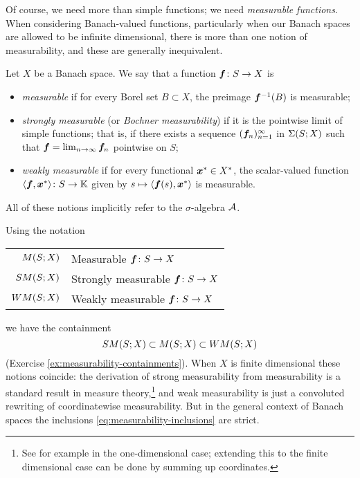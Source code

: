 Of course, we need more than simple functions; we need \emph{measurable functions}.
When considering Banach-valued functions, particularly when our Banach spaces are allowed to be infinite dimensional, there is more than one notion of measurability, and these are generally inequivalent.

\begin{defn}
  Let $X$ be a Banach space.
  We say that a function $\bm{f} \colon S \rightarrow X$ is
  \begin{itemize}
  \item
    \emph{measurable} if for every Borel set $B \subset X$, the preimage $\bm{f}^{-1}(B)$ is measurable;
  \item
    \emph{strongly measurable} (or \emph{Bochner measurability}) if it is the pointwise limit of simple functions; that is, if there exists a sequence $(\bm{f}_n)_{n=1}^\infty$ in $\Sigma(S;X)$ such that $\bm{f} = \lim_{n \to \infty} \bm{f}_n$ pointwise on $S$;
  \item
    \emph{weakly measurable} if for every functional $\bm{x}^* \in X^*$, the scalar-valued function $\langle \bm{f}, \bm{x}^*\rangle \colon S \rightarrow \mathbb{K}$ given by $s \mapsto \langle \bm{f}(s), \bm{x}^* \rangle$ is measurable.
  \end{itemize}
  All of these notions implicitly refer to the $\sigma$-algebra $\mathcal{A}$.
\end{defn}

Using the notation
\begin{center}
  \begin{tabular}{r|l}
    $M (S;X)$  & Measurable $\bm{f} \colon S \rightarrow X$    \\
    $SM(S;X)$  & Strongly measurable $\bm{f} \colon S \rightarrow X$ \\
    $WM(S;X)$  & Weakly measurable $\bm{f} \colon S \rightarrow X$
  \end{tabular}
\end{center}
we have the containment
\begin{equation}\label{eq:measurability-inclusions}
  SM(S;X) \subset M(S;X) \subset WM(S;X)
\end{equation}
(Exercise \ref{ex:measurability-containments}).
When $X$ is finite dimensional these notions coincide: the derivation of strong measurability from measurability is a standard result in measure theory,\footnote{See for example \cite[Corollary 4.2.7]{rD04} in the one-dimensional case; extending this to the finite dimensional case can be done by summing up coordinates.} and weak measurability is just a convoluted rewriting of coordinatewise measurability.
But in the general context of Banach spaces the inclusions \eqref{eq:measurability-inclusions} are strict.


